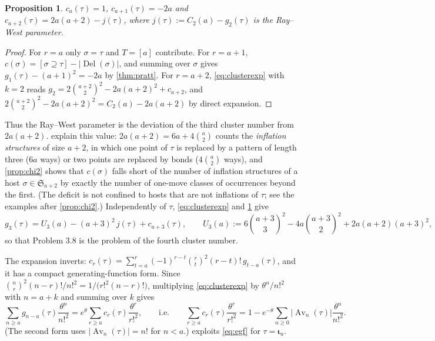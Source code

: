 \documentclass[11pt,reqno]{amsart}
\theoremstyle{plain}
\newtheorem{proposition}[proposition]{Proposition}
\theoremstyle{definition}
\theoremstyle{remark}
\newcommand{\Av}{\operatorname{Av}}
\newcommand{\Del}{\operatorname{Del}}
\let\greekiota\iota
\renewcommand{\iota}{\boldsymbol{\greekiota}}
\newcommand{\bb}[1]{\left[#1\right]}
\newcommand{\Sym}{\mathfrak{S}}
\begin{document}
\begin{proposition}\label{prop:firstclusters}
$c_a(\tau)=1$, $c_{a+1}(\tau)=-2a$ and $c_{a+2}(\tau)=2a(a+2)-j(\tau)$, where $j(\tau):=C_2(a)-g_2(\tau)$ is the Ray--West parameter.
\end{proposition}

\begin{proof}
For $r=a$ only $\sigma=\tau$ and $T=[a]$ contribute. For $r=a+1$, $c(\sigma)=\bb{\sigma\supseteq\tau}-|\Del(\sigma)|$, and summing over $\sigma$ gives $g_1(\tau)-(a+1)^2=-2a$ by \cref{thm:pratt}. For $r=a+2$, \eqref{eq:clusterexp} with $k=2$ reads $g_2=2\binom{a+2}{2}^2-2a(a+2)^2+c_{a+2}$, and $2\binom{a+2}2^2-2a(a+2)^2=C_2(a)-2a(a+2)$ by direct expansion.
\end{proof}

Thus the Ray--West parameter is the deviation of the third cluster number from $2a(a+2)$.  explain this value: $2a(a+2)=6a+4\binom a2$ counts the \emph{inflation structures} of size $a+2$, in which one point of $\tau$ is replaced by a pattern of length three ($6a$ ways) or two points are replaced by bonds ($4\binom a2$ ways), and \cref{prop:chi2} shows that $c(\sigma)$ falls short of the number of inflation structures of a host $\sigma\in\Sym_{a+2}$ by exactly the number of one-move classes of occurrences beyond the first. (The deficit is not confined to hosts that are not inflations of $\tau$; see the examples after \cref{prop:chi2}.) Independently of $\tau$, \eqref{eq:clusterexp} and \cref{prop:firstclusters} give
\begin{equation}\label{eq:g3cluster}
g_3(\tau)=U_3(a)-(a+3)^2\,j(\tau)+c_{a+3}(\tau),\qquad U_3(a):=6\binom{a+3}3^2-4a\binom{a+3}2^2+2a(a+2)(a+3)^2,
\end{equation}
so that Problem 3.8 is the problem of the fourth cluster number.

The expansion inverts: $c_r(\tau)=\sum_{t=a}^{r}(-1)^{r-t}\binom rt^2(r-t)!\,g_{t-a}(\tau)$, and it has a compact generating-function form. Since $\binom nr^2(n-r)!/n!^2=1/\bigl(r!^2(n-r)!\bigr)$, multiplying \eqref{eq:clusterexp} by $\theta^{n}/n!^2$ with $n=a+k$ and summing over $k$ gives
\begin{equation}\label{eq:egf}
\sum_{n\ge a}g_{n-a}(\tau)\frac{\theta^n}{n!^2}=e^{\theta}\sum_{r\ge a}c_r(\tau)\frac{\theta^r}{r!^2},
\qquad\text{i.e.}\qquad
\sum_{r\ge a}c_r(\tau)\frac{\theta^r}{r!^2}=1-e^{-\theta}\sum_{n\ge0}|\Av_n(\tau)|\frac{\theta^n}{n!^2}.
\end{equation}
(The second form uses $|\Av_n(\tau)|=n!$ for $n<a$.)  exploits \eqref{eq:egf} for $\tau=\iota_a$.
\end{document}
